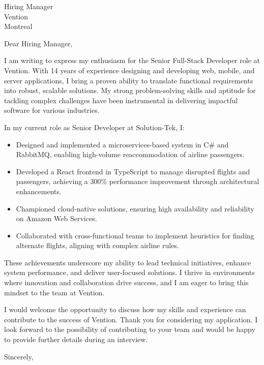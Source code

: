 \documentclass[10pt]{letter}
\begin{document}
\begin{letter}{Hiring Manager \\ Vention \\ Montreal}  

\opening{Dear Hiring Manager,}

I am writing to express my enthusiasm for the Senior Full-Stack Developer role at Vention. With 14 years of experience designing and developing web, mobile, and server applications, I bring a proven ability to translate functional requirements into robust, scalable solutions. My strong problem-solving skills and aptitude for tackling complex challenges have been instrumental in delivering impactful software for various industries.

In my current role as Senior Developer at Solution-Tek, I:

\begin{itemize}
  \item Designed and implemented a microservices-based system in C\# and RabbitMQ, enabling high-volume reaccommodation of airline passengers.
  \item Developed a React frontend in TypeScript to manage disrupted flights and passengers, achieving a 300\% performance improvement through architectural enhancements.
  \item Championed cloud-native solutions, ensuring high availability and reliability on Amazon Web Services.
  \item Collaborated with cross-functional teams to implement heuristics for finding alternate flights, aligning with complex airline rules.
\end{itemize}

These achievements underscore my ability to lead technical initiatives, enhance system performance, and deliver user-focused solutions. I thrive in environments where innovation and collaboration drive success, and I am eager to bring this mindset to the team at Vention.



I would welcome the opportunity to discuss how my skills and experience can contribute to the success of Vention. Thank you for considering my application. I look forward to the possibility of contributing to your team and would be happy to provide further details during an interview.

\closing{Sincerely,}

\end{letter}
\end{document}
